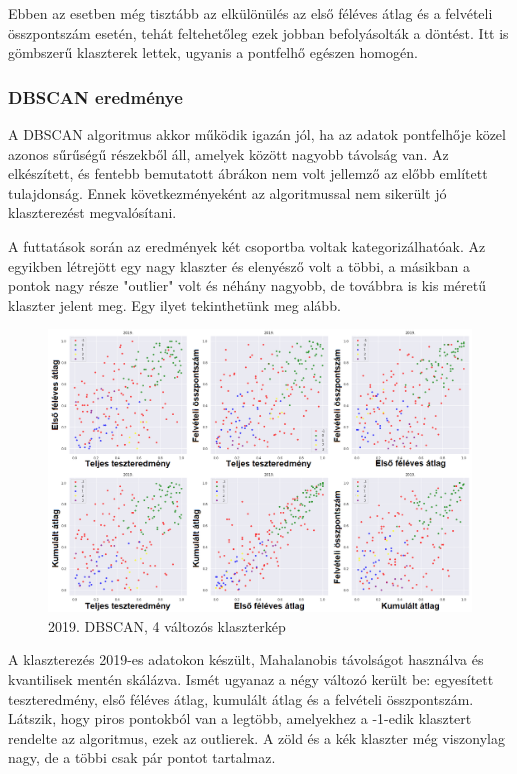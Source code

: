 \documentclass[12pt]{article}
\begin{document}
Ebben az esetben még tisztább az elkülönülés az első féléves átlag és a felvételi összpontszám esetén, tehát feltehetőleg ezek jobban befolyásolták a döntést. Itt is gömbszerű klaszterek lettek, ugyanis a pontfelhő egészen homogén.

\subsubsection{DBSCAN eredménye}

A DBSCAN algoritmus akkor működik igazán jól, ha az adatok pontfelhője közel azonos sűrűségű részekből áll, amelyek között nagyobb távolság van. Az elkészített, és fentebb bemutatott ábrákon nem volt jellemző az előbb említett tulajdonság. Ennek következményeként az algoritmussal nem sikerült jó klaszterezést megvalósítani.

A futtatások során az eredmények két csoportba voltak kategorizálhatóak. Az egyikben létrejött egy nagy klaszter és elenyésző volt a többi, a másikban a pontok nagy része "outlier" volt és néhány nagyobb, de továbbra is kis méretű klaszter jelent meg. Egy ilyet tekinthetünk meg alább.

\begin{figure}[H]
\centering
\includegraphics[width = \textwidth]{kepek/dbscan2.png}
\caption{2019. DBSCAN, 4 változós klaszterkép}
\label{fig:dbscan2}
\end{figure}

A klaszterezés 2019-es adatokon készült, Mahalanobis távolságot használva és kvantilisek mentén skálázva. Ismét ugyanaz a négy változó került be: egyesített teszteredmény, első féléves átlag, kumulált átlag és a felvételi összpontszám. Látszik, hogy piros pontokból van a legtöbb, amelyekhez a -1-edik klasztert rendelte az algoritmus, ezek az outlierek. A zöld és a kék klaszter még viszonylag nagy, de a többi csak pár pontot tartalmaz.
\end{document}
